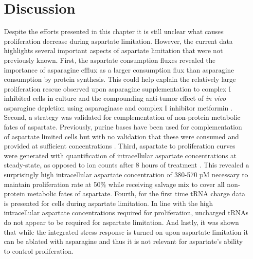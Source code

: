 \section{Discussion}
Despite the efforts presented in this chapter it is still unclear what causes proliferation decrease during aspartate limitation.
However, the current data highlights several important aspects of aspartate limitation that were not previously known.
First, the aspartate consumption fluxes revealed the importance of asparagine efflux as a larger consumption flux than asparagine consumption by protein synthesis.
This could help explain the relatively large proliferation rescue observed upon asparagine supplementation to complex I inhibited cells in culture and the compounding anti-tumor effect of \textit{in vivo} asparagine depletion using 
asparaginase and complex I inhibitor metformin \cite{Krall2021-mb}.
Second, a strategy was validated for complementation of non-protein metabolic fates of aspartate.
Previously, purine bases have been used for complementation of aspartate limited cells but with no validation that these were consumed and provided at sufficient concentrations \cite{Sullivan2015-xf}.
Third, aspartate to proliferation curves were generated with quantification of intracellular aspartate concentrations at steady-state, as opposed to ion counts after 8 hours of treatment \cite{Gui2016-ca}.
This revealed a surprisingly high intracellular aspartate concentration of 380-570 µM necessary to maintain proliferation rate at 50\% while receiving salvage mix to cover all non-protein metabolic fates of aspartate.
Fourth, for the first time tRNA charge data is presented for cells during aspartate limitation.
In line with the high intracellular aspartate concentrations required for proliferation, uncharged tRNAs do not appear to be required for aspartate limitation.
And lastly, it was shown that while the integrated stress response is turned on upon aspartate limitation it can be ablated with asparagine and thus it is not relevant for aspartate's ability to control proliferation.

